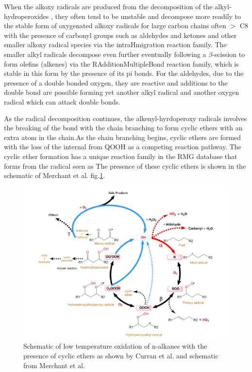When the alkoxy radicals are produced  from the decomposition of the alkyl-hydroperoxides , they often tend to be unstable and decompose more readily to the stable form of oxygenated alkoxy radicals for large carbon chains often $>$ C8 with the presence of carbonyl groups such as aldehydes and ketones and other smaller alkoxy radical species via the intra\textunderscore H\textunderscore migration reaction family. The smaller alkyl radicals decompose even further eventually following a $\beta$-scission to form olefins (alkenes) via the R\textunderscore Addition\textunderscore MultipleBond reaction family, which is stable in this form by the presence of its pi bonds. For the aldehydes, due to the presence of a double bonded oxygen, they are reactive and additions to the double bond are possible forming yet another alkyl radical and another oxygen radical which can attack double bonds. 


As the radical decomposition continues, the alkenyl-hyrdoperoxy radicals involves the breaking of the  bond with the chain branching to form cyclic ethers with an extra  atom in the chain.As the chain branching begins, cyclic ethers are formed with the loss of the internal  from QOOH as a competing reaction pathway. The cyclic ether formation has a unique reaction family in the RMG database that forms from the  radical seen as  The presence of these cyclic ethers is shown in the schematic of Merchant et al.\cite{Merchant2015UnderstandingPropane} fig.\ref{fig:cyclic-ethers}. 

\begin{figure}[!ht]
\hspace*{-3cm}
    \centering
    \includegraphics[scale=0.45, keepaspectratio]{images/nalkane-schematic+ROR.png}
    \caption{Schematic of low temperature oxidation of n-alkanes with the presence of cyclic ethers as shown by Curran et al.\cite{Curran1998AOxidation} and schematic from Merchant et al.\cite{Merchant2015UnderstandingPropane}}
    \label{fig:cyclic-ethers}
\end{figure}


